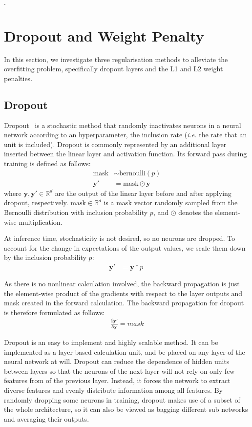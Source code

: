 \documentclass{article}
\begin{document}
\questionEleven.




\section{Dropout and Weight Penalty}
\label{sec:task2.1} 

In this section, we investigate three regularisation methods to alleviate the overfitting problem, specifically dropout layers and the L1 and L2 weight penalties.


\subsection{Dropout}

Dropout~\cite{srivastava2014dropout} is a stochastic method that randomly inactivates neurons in a neural network according to an hyperparameter, the inclusion rate  (\textit{i.e.} the rate that an unit is included).
Dropout is commonly represented by an additional layer inserted between the linear layer and activation function.
Its forward pass during training is defined as follows:
\begin{align}
    \text{mask} &\sim \text{bernoulli}(p)\\
    \bm{y}' &= \text{mask} \odot \bm{y}\
\end{align}
where $\bm{y}, \bm{y}' \in \mathbb{R}^d$ are the output of the linear layer before and after applying dropout, respectively. 
$\text{mask} \in \mathbb{R}^d$ is a mask vector randomly sampled from the Bernoulli distribution with inclusion probability $p$, and $\odot$ denotes the element-wise multiplication.

At inference time, stochasticity is not desired, so no neurons are dropped. 
To account for the change in expectations of the output values, we scale them down by the inclusion probability $p$:
\begin{align}
    \bm{y}' &= \bm{y}*p\
\end{align}

As there is no nonlinear calculation involved, the backward propagation is just the element-wise product of the gradients with respect to the layer outputs and mask created in the forward calculation. 
The backward propagation for dropout is therefore formulated as follows:
\begin{align}
    \frac{\partial \bm{y}'}{\partial \bm{y}} = mask
\end{align}

Dropout is an easy to implement and highly scalable method. 
It can be implemented as a layer-based calculation unit, and be placed on any layer of the neural network at will. 
Dropout can reduce the dependence of hidden units between layers so that the neurons of the next layer will not rely on only few features from of the previous layer.
Instead, it forces the network to extract diverse features and evenly distribute information among all features. 
By randomly dropping some neurons in training, dropout makes use of a subset of the whole architecture, so it can also be viewed as bagging different sub networks and averaging their outputs.
\end{document}

